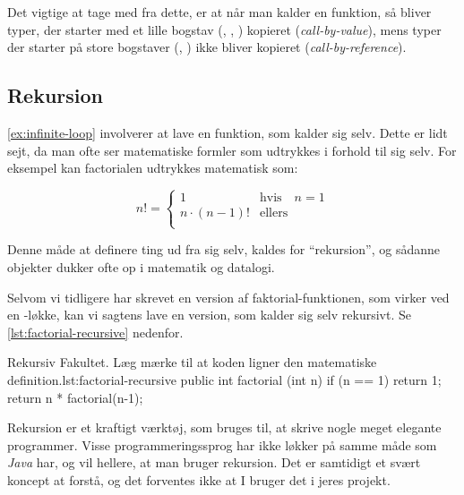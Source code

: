         Det vigtige at tage med fra dette, er at når man kalder en
        funktion, så bliver typer, der starter med et lille bogstav
        (, , ) kopieret
        (\emph{call-by-value}), mens typer der starter på store
        bogstaver (, ) ikke bliver kopieret
        (\emph{call-by-reference}).

	\subsection{Rekursion}

        \autoref{ex:infinite-loop} involverer at lave en funktion, som kalder sig selv. Dette er lidt sejt, da man ofte ser matematiske formler som udtrykkes i
        forhold til sig selv. For eksempel kan \gls{factorial}en
        udtrykkes matematisk som:

        \begin{equation}
            n! = \begin{cases}
                       1 & \text{hvis} \quad n = 1 \\
                       n\cdot(n-1)! & \text{ellers} \\
                  \end{cases}
        \end{equation}

        Denne måde at definere ting ud fra sig selv, kaldes for
        ``rekursion'', og sådanne objekter dukker ofte op i matematik
        og datalogi.


        Selvom vi tidligere har skrevet en version af
        faktorial-funktionen, som virker ved en -løkke,
        kan vi sagtens lave en version, som kalder sig selv rekursivt.
        Se \autoref{lst:factorial-recursive} nedenfor.

        \begin{JavaCode}{Rekursiv Fakultet. Læg mærke til at koden ligner den matematiske definition.}{lst:factorial-recursive}
            public int factorial (int n) {
                if (n == 1) return 1;
                return n * factorial(n-1);
            }
        \end{JavaCode}

        Rekursion er et kraftigt værktøj, som bruges til, at skrive
        nogle meget elegante programmer. Visse programmeringssprog har
        ikke løkker på samme måde som \emph{Java} har, og vil hellere,
        at man bruger rekursion.  Det er samtidigt et svært koncept at
        forstå, og det forventes ikke at I bruger det i jeres projekt.

